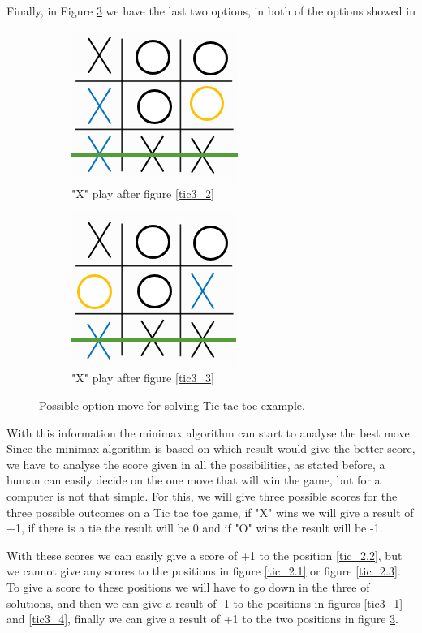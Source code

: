 \documentclass[conference]{IEEEtran}
\begin{document}
Finally, in Figure \ref{atic4} we have the last two options, in both of the options showed in 

\begin{figure}[H]
\centering
\begin{subfigure}{.24\textwidth}
    \centering
    \includegraphics[scale=0.45]{img/chess4_1.png}
    \caption{"X" play after figure \ref{tic3_2}}
    \label{atic4_1}
\end{subfigure}
\begin{subfigure}{.24\textwidth}
    \centering
    \includegraphics[scale=0.45]{img/chess4_2.png} 
    \caption{"X" play after figure \ref{tic3_3}}
    \label{atic4_2}
\end{subfigure}
\caption{Possible option move for solving Tic tac toe example.}
\label{atic4}
\end{figure}

With this information the minimax algorithm can start to analyse the best move. Since the minimax algorithm is based on which result would give the better score, we have to analyse the score given in all the possibilities, as stated before, a human can easily decide on the one move that will win the game, but for a computer is not that simple. For this, we will give three possible scores for the three possible outcomes on a Tic tac toe game, if "X" wins we will give a result of +1, if there is a tie the result will be 0 and if "O" wins the result will be -1.

With these scores we can easily give a score of +1 to the position \ref{tic_2.2}, but we cannot give any scores to the positions in figure \ref{tic_2.1} or figure \ref{tic_2.3}. To give a score to these positions we will have to go down in the three of solutions, and then we can give a result of -1 to the positions in figures \ref{tic3_1} and \ref{tic3_4}, finally we can give a result of +1 to the two positions in figure \ref{atic4}.
\end{document}
